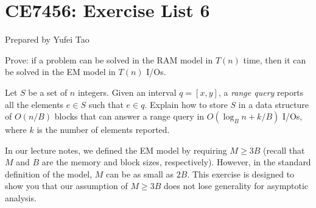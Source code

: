 


\usepackage{amsfonts, amsmath, amssymb, amsthm}
\usepackage{comment}
\usepackage{graphicx}
\usepackage{ifthen}
\usepackage{latexsym}
\usepackage[normalem]{ulem}



\def\In{\text{IN}}
\def\out{\text{OUT}}
\def\A{\mathcal{A}}
\def\E{\mathcal{E}}
\def\H{\mathcal{H}}
\def\Q{\mathcal{Q}}
\def\T{\mathcal{T}}
\def\V{\mathcal{V}}
\def\W{\mathscr{W}}


\def\vgap{\vspace{2mm}}



\section*{CE7456: Exercise List 6}
Prepared by Yufei Tao \\



 Prove: if a problem can be solved in the RAM model in $T(n)$ time, then it can be solved in the EM model in $T(n)$ I/Os.

 Let $S$ be a set of $n$ integers. Given an interval $q = [x, y]$, a {\em range query} reports all the elements $e \in S$ such that $e \in q$. Explain how to store $S$ in a data structure of $O(n/B)$ blocks that can answer a range query in $O(\log_B n + k / B)$ I/Os, where $k$ is the number of elements reported.

 In our lecture notes, we defined the EM model by requiring $M \ge 3B$ (recall that $M$ and $B$ are the memory and block sizes, respectively). However, in the standard definition of the model, $M$ can be as small as $2B$. This exercise is designed to show you that our assumption of $M \ge 3B$ does not lose generality for asymptotic analysis.

